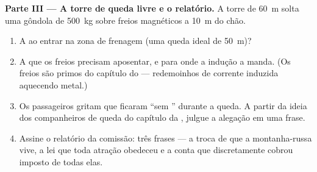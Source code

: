 \begin{problem}
\medskip\noindent\textbf{Parte III --- A torre de queda livre e o
relatório.}
A torre de \qty{60}{m} solta uma gôndola de \qty{500}{kg} sobre
freios magnéticos a \qty{10}{m} do chão.
\begin{enumerate}[resume]
  \item A  ao entrar na zona de frenagem (uma queda ideal
        de \qty{50}{m})?
  \item A  que os freios precisam aposentar, e para onde a
        indução a manda. (Os freios são primos do capítulo do
         --- redemoinhos de corrente induzida aquecendo
        metal.)
  \item Os passageiros gritam que ficaram ``sem '' durante a
        queda. A partir da ideia dos companheiros de queda do
        capítulo da , julgue a alegação em uma frase.
  \item Assine o relatório da comissão: três frases --- a troca de
        que a montanha-russa vive, a lei que toda atração obedeceu e
        a conta que discretamente cobrou imposto de todas elas.
\end{enumerate}
\end{problem}
